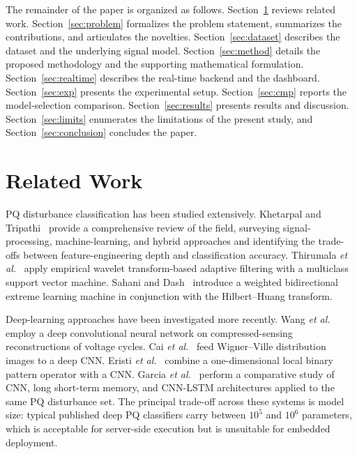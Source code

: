 \documentclass[conference]{IEEEtran}
\begin{document}
The remainder of the paper is organized as follows.
Section~\ref{sec:related} reviews related work.
Section~\ref{sec:problem} formalizes the problem statement, summarizes
the contributions, and articulates the novelties.
Section~\ref{sec:dataset} describes the dataset and the underlying
signal model. Section~\ref{sec:method} details the proposed methodology
and the supporting mathematical formulation. Section~\ref{sec:realtime}
describes the real-time backend and the dashboard.
Section~\ref{sec:exp} presents the experimental setup.
Section~\ref{sec:cmp} reports the model-selection comparison.
Section~\ref{sec:results} presents results and discussion.
Section~\ref{sec:limits} enumerates the limitations of the present
study, and Section~\ref{sec:conclusion} concludes the paper.

\section{Related Work}\label{sec:related}
PQ disturbance classification has been studied extensively. Khetarpal
and Tripathi~\cite{khetarpal2020review} provide a comprehensive review
of the field, surveying signal-processing, machine-learning, and hybrid
approaches and identifying the trade-offs between feature-engineering
depth and classification accuracy. Thirumala \emph{et al.}\
\cite{thirumala2019ewt} apply empirical wavelet transform-based
adaptive filtering with a multiclass support vector machine. Sahani
and Dash~\cite{sahani2021welm} introduce a weighted bidirectional
extreme learning machine in conjunction with the Hilbert--Huang
transform.

Deep-learning approaches have been investigated more recently. Wang
\emph{et al.}\ \cite{wang2020compressed} employ a deep convolutional
neural network on compressed-sensing reconstructions of voltage cycles.
Cai \emph{et al.}\ \cite{cai2020wigner} feed Wigner--Ville distribution
images to a deep CNN. Eristi \emph{et al.}\ \cite{eristi2021lbp} combine
a one-dimensional local binary pattern operator with a CNN. Garcia
\emph{et al.}\ \cite{garcia2020comparison} perform a comparative study
of CNN, long short-term memory, and CNN-LSTM architectures applied to
the same PQ disturbance set. The principal trade-off across these
systems is model size: typical published deep PQ classifiers carry
between $10^{5}$ and $10^{6}$ parameters, which is acceptable for
server-side execution but is unsuitable for embedded deployment.
\end{document}
